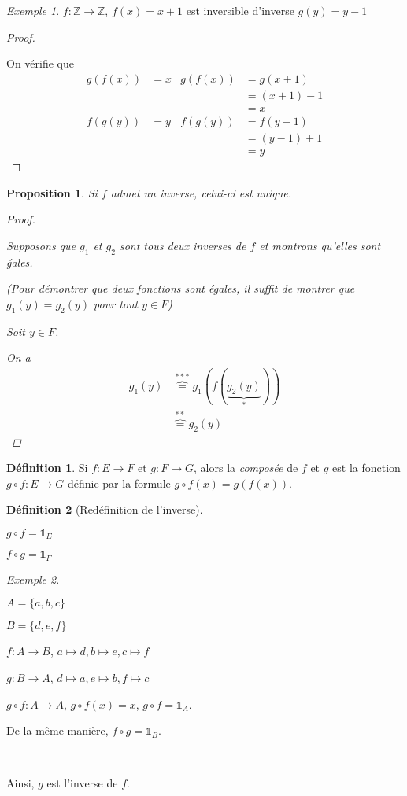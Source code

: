 \documentclass{report}
\newcommand*{\entiers}{\mathbb{Z}}
\newtheorem*{prop}{Proposition}
\theoremstyle{definition}
\newtheorem*{defin}{D\'efinition}
\theoremstyle{remark}
\newtheorem*{exem}{Exemple}
\begin{document}
	\begin{exem}
		$f:\entiers \to \entiers$, $f(x)=x+1$ est inversible d'inverse $g(y)=y-1$

		\begin{proof}
			~

			On v\'erifie que
			\begin{align*}
				g(f(x))&= x& g(f(x))&= g(x+1)\\
				&&&= (x+1)-1\\
				&&&= x\\
				f(g(y))&= y& f(g(y))&= f(y-1)\\
				&&&= (y-1)+1\\
				&&&= y
			\end{align*}
		\end{proof}
	\end{exem}

	\begin{prop}
		Si $f$ admet un inverse, celui-ci est unique.

		\begin{proof}
			~

			Supposons que $g_1$ et $g_2$ sont tous deux inverses de $f$ et montrons qu'elles sont \'gales.

			(Pour d\'emontrer que deux fonctions sont \'egales, il suffit de montrer que $g_1(y)=g_2(y)$ pour tout $y \in F$)

			Soit $y \in F$.

			On a
			\begin{align*}
				g_1(y)&\overbrace{=}^{***} g_1(f(\underbrace{g_2(y)}_{*}))\\
				&\overbrace{=}^{**} g_2(y)
			\end{align*}
		\end{proof}
	\end{prop}

	\begin{defin}
		Si $f:E \to F$ et $g:F \to G$, alors la \emph{compos\'ee} de $f$ et $g$ est la fonction $g \circ f:E \to G$ d\'efinie par la formule $g \circ f(x)=g(f(x))$.
	\end{defin}

	\begin{defin}[Red\'efinition de l'inverse]~
		
		$g \circ f=\mathds{1}_E$

		$f \circ g=\mathds{1}_F$
	\end{defin}

	\begin{exem}~
		
		$A=\{a,b,c\}$

		$B=\{d,e,f\}$

		$f:A \to B$, $a \mapsto d, b \mapsto e, c \mapsto f$

		$g:B \to A$, $d \mapsto a, e \mapsto b, f \mapsto c$

		$g \circ f:A \to A$, $g \circ f(x)=x$, $g \circ f=\mathds{1}_A$.

		De la m\^eme mani\`ere, $f \circ g=\mathds{1}_B$.

		~

		Ainsi, $g$ est l'inverse de $f$.
	\end{exem}
\end{document}
